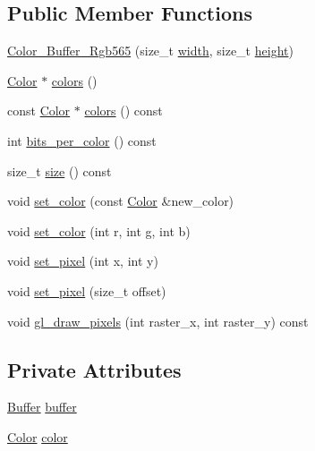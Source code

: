 \subsection*{Public Member Functions}
\begin{DoxyCompactItemize}
\item 
\mbox{\hyperlink{classrenderer_1_1_color___buffer___rgb565_ad08f0151e303070965a5c4624577a823}{Color\+\_\+\+Buffer\+\_\+\+Rgb565}} (size\+\_\+t \mbox{\hyperlink{classrenderer_1_1_color___buffer_ace3fab0552b94a1d7d7afcc592cd4503}{width}}, size\+\_\+t \mbox{\hyperlink{classrenderer_1_1_color___buffer_a9a26f6f8e04447ac2b26c38e0a190714}{height}})
\item 
\mbox{\hyperlink{structrenderer_1_1_color___buffer___rgb565_1_1_color}{Color}} $\ast$ \mbox{\hyperlink{classrenderer_1_1_color___buffer___rgb565_aa209340b48cd679650f5965caef8dd76}{colors}} ()
\item 
const \mbox{\hyperlink{structrenderer_1_1_color___buffer___rgb565_1_1_color}{Color}} $\ast$ \mbox{\hyperlink{classrenderer_1_1_color___buffer___rgb565_acf5016c64a12241e770a149dc1793fce}{colors}} () const
\item 
int \mbox{\hyperlink{classrenderer_1_1_color___buffer___rgb565_a71920b761aa6ce5b05c1e587c168a6d4}{bits\+\_\+per\+\_\+color}} () const
\item 
size\+\_\+t \mbox{\hyperlink{classrenderer_1_1_color___buffer___rgb565_a0bb8eba0bf02fdc13fe8e1c67906631e}{size}} () const
\item 
void \mbox{\hyperlink{classrenderer_1_1_color___buffer___rgb565_aab74559163ff67f50416f5dc5a85bc97}{set\+\_\+color}} (const \mbox{\hyperlink{structrenderer_1_1_color___buffer___rgb565_1_1_color}{Color}} \&new\+\_\+color)
\item 
void \mbox{\hyperlink{classrenderer_1_1_color___buffer___rgb565_aad9ed69a24b11f14f7efb6fc81bd82e7}{set\+\_\+color}} (int r, int g, int b)
\item 
void \mbox{\hyperlink{classrenderer_1_1_color___buffer___rgb565_ab3f0706720c48f42cbc8aa771ea3178e}{set\+\_\+pixel}} (int x, int y)
\item 
void \mbox{\hyperlink{classrenderer_1_1_color___buffer___rgb565_af07fc1066c1654ed887952db87a8869a}{set\+\_\+pixel}} (size\+\_\+t offset)
\item 
void \mbox{\hyperlink{classrenderer_1_1_color___buffer___rgb565_a8e9e5e0646c4ac90e4867e8f83352eaa}{gl\+\_\+draw\+\_\+pixels}} (int raster\+\_\+x, int raster\+\_\+y) const
\end{DoxyCompactItemize}
\subsection*{Private Attributes}
\begin{DoxyCompactItemize}
\item 
\mbox{\hyperlink{classrenderer_1_1_color___buffer___rgb565_a60feae2b617049e32ecfb9e87349272c}{Buffer}} \mbox{\hyperlink{classrenderer_1_1_color___buffer___rgb565_af8e027cd7b139e5f795001db42c84058}{buffer}}
\item 
\mbox{\hyperlink{structrenderer_1_1_color___buffer___rgb565_1_1_color}{Color}} \mbox{\hyperlink{classrenderer_1_1_color___buffer___rgb565_a57d65a5c62338338f7081a32c9227e98}{color}}
\end{DoxyCompactItemize}
